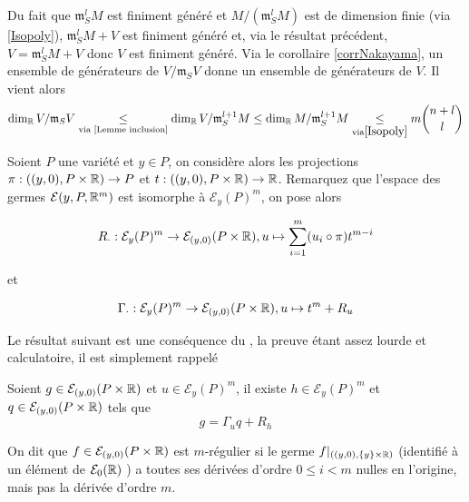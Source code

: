 \documentclass[memoire.tex]{subfiles}
\begin{document}
\begin{preuve}
    Du fait que 
    $\mathfrak{m}_S^lM$ est finiment généré et 
    $M/(\mathfrak{m}_S^lM)$ est de dimension finie (via 
    \ref{Isopoly}), $\mathfrak{m}_S^{l}M+V$ est finiment 
    généré et, via le résultat précédent, 
    $V=\mathfrak{m}_S^{l}M+V$ donc $V$ est finiment généré. 
    Via le corollaire \ref{corrNakayama}, un ensemble de 
    générateurs de   $V/\mathfrak{m}_SV$ donne un ensemble de générateurs de $V$. Il vient alors 
    \begin{equation*}
        \dim_{\mathbb{R}} V/\mathfrak{m}_SV\underset{\text{via \ref{Lemme inclusion}}}{\leq}\dim_{\mathbb{R}} V/\mathfrak{m}^{l+1}_SM\leq \dim_{\mathbb{R}} M/\mathfrak{m}^{l+1}_SM\underset{\text{via} \ref{Isopoly}}{\leq}  m{n+l\choose l}
    \end{equation*}
\end{preuve}


Soient $P$ une variété et $y\in P$,
on considère alors les projections 
$\pi:((y,0),P\times \mathbb{R})\rightarrow P$ et $t:((y,0),
P\times \mathbb{R})\rightarrow \mathbb{R}$. Remarquez que l'espace des germes $\mathcal{E}(y,P,\mathbb{R}^m)$ est isomorphe à  $\mathcal{E}_{y}(P)^m$, on pose alors

\begin{equation*}
    R_{\cdot}:\mathcal{E}_y(P)^m\rightarrow \mathcal{E}_{(y,0)}(P\times \mathbb{R}),u\mapsto \sum_{i=1}^{m}(u_i\circ \pi)t^{m-i}
\end{equation*}

et 

\begin{equation*}
    \Gamma_{\cdot}:\mathcal{E}_y(P)^m\rightarrow \mathcal{E}_{(y,0)}(P\times \mathbb{R}),u\mapsto t^m+R_u
\end{equation*}

Le résultat suivant est une conséquence du , la preuve étant assez lourde et 
calculatoire, il est simplement rappelé

\begin{lemme}\label{DivMather}
Soient $g\in\mathcal{E}_{(y,0)}(P\times \mathbb{R})$ et 
$u\in\mathcal{E}_y(P)^m$, il existe $h\in\mathcal{E}_y(P)
^m$ et $q\in\mathcal{E}_{(y,0)}(P\times \mathbb{R})$ tels que
\begin{equation*}
    g=\Gamma_u q +R_h
\end{equation*}
\end{lemme}
\begin{definition}
    On dit que $f\in\mathcal{E}_{(y,0)}(P\times\mathbb{R})$ est $m$-régulier si le germe $f|_{((y,0),\left\{y\right\}\times \mathbb{R} )}$ (identifié à un élément de $\mathcal{E}_0(\mathbb{R})$ ) a toutes ses dérivées d'ordre $0\leq i < m$  nulles en l'origine, mais pas la dérivée d'ordre $m$.
\end{definition}
\end{document}
